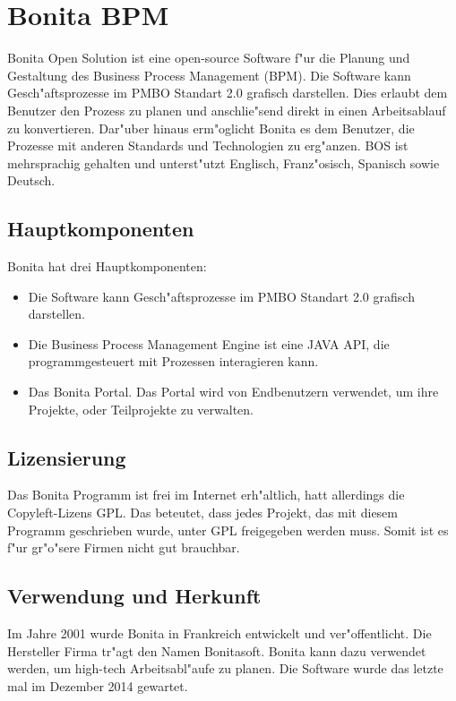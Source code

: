\section{Bonita BPM}

Bonita Open Solution ist eine open-source Software f"ur die Planung und Gestaltung des Business Process Management (BPM). Die Software kann Gesch"aftsprozesse im PMBO Standart 2.0 grafisch darstellen. Dies erlaubt dem Benutzer den Prozess zu planen und anschlie"send direkt in einen Arbeitsablauf zu konvertieren. Dar"uber hinaus erm"oglicht Bonita es dem Benutzer, die Prozesse mit anderen Standards und Technologien zu erg"anzen. BOS ist mehrsprachig gehalten und unterst"utzt Englisch, Franz"osisch, Spanisch sowie Deutsch.

\subsection{Hauptkomponenten}

Bonita hat drei Hauptkomponenten:
\begin{itemize}
\item Die Software kann Gesch"aftsprozesse im PMBO Standart 2.0 grafisch darstellen.
\item Die Business Process Management Engine ist eine JAVA API, die programmgesteuert mit Prozessen interagieren kann.
\item Das Bonita Portal. Das Portal wird von Endbenutzern verwendet, um ihre Projekte, oder Teilprojekte zu verwalten.
\end{itemize}

\subsection{Lizensierung}

Das Bonita Programm ist frei im Internet erh"altlich, hatt allerdings die Copyleft-Lizens GPL. Das beteutet, dass jedes Projekt, das mit diesem Programm geschrieben wurde, unter GPL freigegeben werden muss. Somit ist es f"ur gr"o"sere Firmen nicht gut brauchbar. 

\subsection{Verwendung und Herkunft}

Im Jahre 2001 wurde Bonita in Frankreich entwickelt und ver"offentlicht. Die Hersteller Firma tr"agt den Namen Bonitasoft. Bonita kann dazu verwendet werden, um high-tech Arbeitsabl"aufe zu planen. Die Software wurde das letzte mal im Dezember 2014  gewartet.
